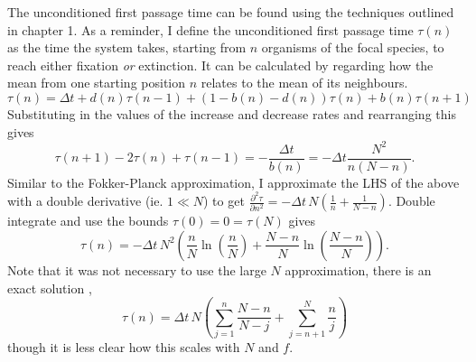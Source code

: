 The unconditioned first passage time can be found using the techniques outlined in chapter 1. 
As a reminder, I define the unconditioned first passage time $\tau(n)$ as the time the system takes, starting from $n$ organisms of the focal species, to reach either fixation \emph{or} extinction. 
It can be calculated by regarding how the mean from one starting position $n$ relates to the mean of its neighbours.
\begin{equation}
\tau(n) = \Delta t + d(n)\tau(n-1) + \left(1-b(n)-d(n)\right)\tau(n) + b(n)\tau(n+1)
\end{equation}
Substituting in the values of the increase and decrease rates and rearranging this gives
\begin{equation*}
\tau(n+1) - 2\tau(n) + \tau(n-1) = -\frac{\Delta t}{b(n)} = -\Delta t\frac{N^2}{n(N-n)}. %
\end{equation*}
Similar to the Fokker-Planck approximation, I approximate the LHS of the above with a double derivative (ie. $1\ll N$) to get $\frac{\partial^2\tau}{\partial n^2} = -\Delta t\,N\left(\frac{1}{n}+\frac{1}{N-n}\right)$. 
Double integrate and use the bounds $\tau(0) = 0 = \tau(N)$ gives
\begin{equation}
\tau(n) = -\Delta t\,N^2\left(\frac{n}{N}\ln\left(\frac{n}{N}\right)+\frac{N-n}{N}\ln\left(\frac{N-n}{N}\right)\right).
\end{equation}
Note that it was not necessary to use the large $N$ approximation, there is an exact solution \cite{Moran1962},
\begin{equation}
\tau(n) = \Delta t\,N\left(\sum_{j=1}^n\frac{N-n}{N-j} + \sum_{j=n+1}^N\frac{n}{j}\right)
\end{equation}
though it is less clear how this scales with $N$ and $f$. 


